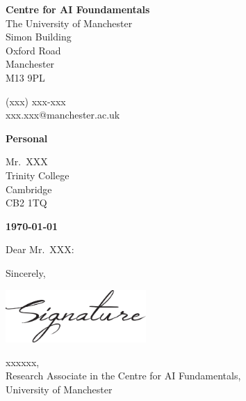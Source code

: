 \documentclass[12pt, a4paper]{letter} %
\begin{document}
\begin{minipage}[t]{0.3\textwidth}
\end{minipage}
\hfill
\begin{minipage}[t]{0.65\textwidth}\raggedright
\raggedleft
\small{
\textbf{\color{uompurple}Centre for AI Foundamentals}\\
\vspace{0.5em}
The University of Manchester\\
Simon Building\\
Oxford Road\\
Manchester\\
M13 9PL

\vspace{0.5em}

(xxx) xxx-xxx\\
xxx.xxx@manchester.ac.uk}
\end{minipage}

\vspace{1em}

\textbf{Personal}

Mr.~XXX\\
Trinity College\\
Cambridge\\
CB2 1TQ

\textbf{\today}

Dear Mr.~XXX:

\lipsum[1-3]

Sincerely,

\includegraphics[width=2.1in]{signature}

xxxxxx,\\
Research Associate in the Centre for AI Fundamentals,\\
University of Manchester
\end{document}

